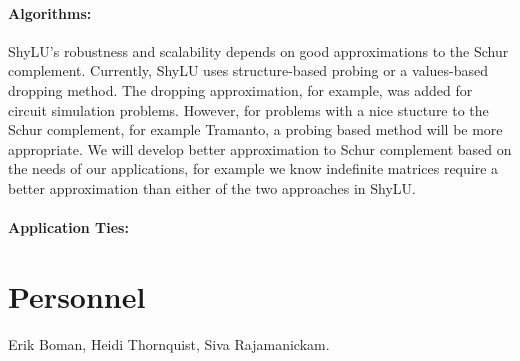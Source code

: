 \documentclass[10pt]{amsart}
\begin{document}
\paragraph{\bf{Algorithms}:} ShyLU's robustness and scalability depends on good
approximations to the Schur complement. Currently, ShyLU uses 
structure-based probing
or a values-based dropping method. The dropping approximation, for
example, was added for circuit simulation problems. However, for problems
with a nice stucture to the Schur complement, for example Tramanto,
a probing based method will be more appropriate. We will develop better
approximation to Schur complement based on the needs of our applications, for
example we know indefinite matrices require a better approximation than either
of the two approaches in ShyLU.

\paragraph{\bf{Application Ties}:}


\section{Personnel}
Erik Boman, Heidi Thornquist, Siva Rajamanickam.
\end{document}
